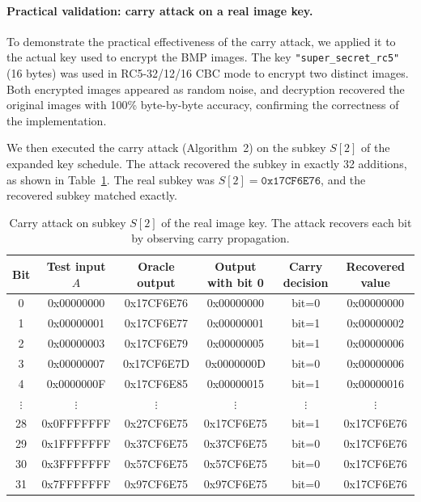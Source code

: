 \documentclass{sbc2023-pdf}%
\theoremstyle{plain}
\begin{document}
\paragraph{Practical validation: carry attack on a real image key.}
To demonstrate the practical effectiveness of the carry attack, we applied it to the actual key used to encrypt the BMP images. The key \texttt{"super\_secret\_rc5"} (16 bytes) was used in RC5-32/12/16 CBC mode to encrypt two distinct images. Both encrypted images appeared as random noise, and decryption recovered the original images with 100\% byte-by-byte accuracy, confirming the correctness of the implementation.

We then executed the carry attack (Algorithm~2) on the subkey \(S[2]\) of the expanded key schedule. The attack recovered the subkey in exactly 32 additions, as shown in Table~\ref{tab:carry_image_attack}. The real subkey was \(S[2] = \texttt{0x17CF6E76}\), and the recovered subkey matched exactly.

\begin{table}[htbp]
\centering
\caption{Carry attack on subkey \(S[2]\) of the real image key. The attack recovers each bit by observing carry propagation.}
\label{tab:carry_image_attack}
\begin{tabular}{c|c|c|c|c|c}
\hline
Bit & Test input \(A\) & Oracle output & Output with bit 0 & Carry decision & Recovered value \\
\hline
0 & 0x00000000 & 0x17CF6E76 & 0x00000000 & bit=0 & 0x00000000 \\
1 & 0x00000001 & 0x17CF6E77 & 0x00000001 & bit=1 & 0x00000002 \\
2 & 0x00000003 & 0x17CF6E79 & 0x00000005 & bit=1 & 0x00000006 \\
3 & 0x00000007 & 0x17CF6E7D & 0x0000000D & bit=0 & 0x00000006 \\
4 & 0x0000000F & 0x17CF6E85 & 0x00000015 & bit=1 & 0x00000016 \\
\(\vdots\) & \(\vdots\) & \(\vdots\) & \(\vdots\) & \(\vdots\) & \(\vdots\) \\
28 & 0x0FFFFFFF & 0x27CF6E75 & 0x17CF6E75 & bit=1 & 0x17CF6E76 \\
29 & 0x1FFFFFFF & 0x37CF6E75 & 0x37CF6E75 & bit=0 & 0x17CF6E76 \\
30 & 0x3FFFFFFF & 0x57CF6E75 & 0x57CF6E75 & bit=0 & 0x17CF6E76 \\
31 & 0x7FFFFFFF & 0x97CF6E75 & 0x97CF6E75 & bit=0 & 0x17CF6E76 \\
\hline
\end{tabular}
\end{table}
\end{document}
